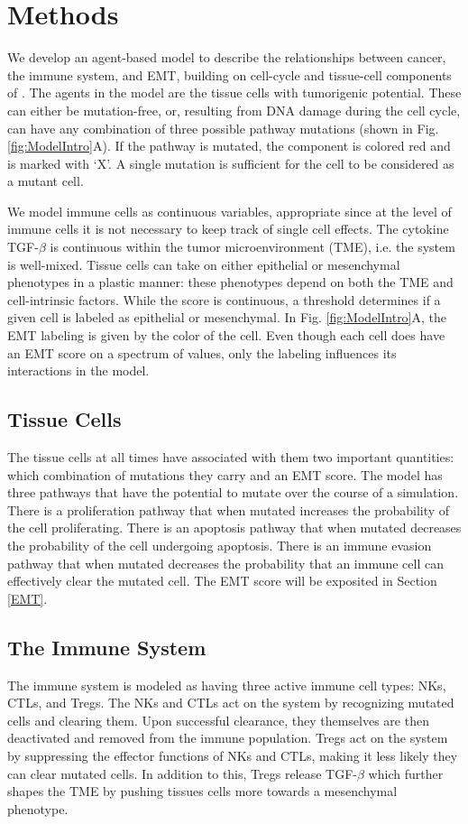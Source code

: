 \documentclass[11pt]{article}
\begin{document}
\section{Methods}
We develop an agent-based model to describe the relationships between cancer, the immune system, and EMT, building on cell-cycle and tissue-cell components of \cite{guo2017multiscale}. 
The agents in the model are the tissue cells with tumorigenic potential.
These can either be mutation-free, or, resulting from DNA damage during the cell cycle, can have any combination of three possible pathway mutations (shown in Fig. \ref{fig:ModelIntro}A).
If the pathway is mutated, the component is colored red and is marked with `X'.
A single mutation is sufficient for the cell to be considered as a mutant cell.
\par
We model immune cells as continuous variables, appropriate since at the level of immune cells it is not necessary to keep track of single cell effects.
The cytokine TGF-$\beta$ is continuous within the tumor microenvironment (TME), i.e. the system is well-mixed.
Tissue cells can take on either epithelial or mesenchymal phenotypes in a plastic manner: these phenotypes depend on both the TME and cell-intrinsic factors.
While the score is continuous, a threshold determines if a given cell is labeled as epithelial or mesenchymal.
In Fig. \ref{fig:ModelIntro}A, the EMT labeling is given by the color of the cell.
Even though each cell does have an EMT score on a spectrum of values, only the labeling influences its interactions in the model.

\subsection{Tissue Cells}\label{TissueCells}
The tissue cells at all times have associated with them two important quantities: which combination of mutations they carry and an EMT score.
The model has three pathways that have the potential to mutate over the course of a simulation.
There is a proliferation pathway that when mutated increases the probability of the cell proliferating.
There is an apoptosis pathway that when mutated decreases the probability of the cell undergoing apoptosis.
There is an immune evasion pathway that when mutated decreases the probability that an immune cell can effectively clear the mutated cell.
The EMT score will be exposited in Section \ref{EMT}. 

\subsection{The Immune System}\label{ImmuneSystem}
The immune system is modeled as having three active immune cell types: NKs, CTLs, and Tregs.
The NKs and CTLs act on the system by recognizing mutated cells and clearing them.
Upon successful clearance, they themselves are then deactivated and removed from the immune population.
Tregs act on the system by suppressing the effector functions of NKs and CTLs, making it less likely they can clear mutated cells.
In addition to this, Tregs release TGF-$\beta$ which further shapes the TME by pushing tissues cells more towards a mesenchymal phenotype.
\end{document}
